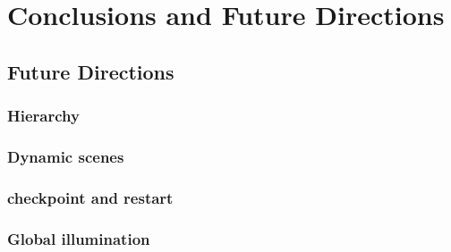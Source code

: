 \section{Conclusions and Future Directions}


\subsection{Future Directions}

\subsubsection{Hierarchy}

\subsubsection{Dynamic scenes}

\subsubsection{checkpoint and restart} 

\subsubsection{Global illumination}


